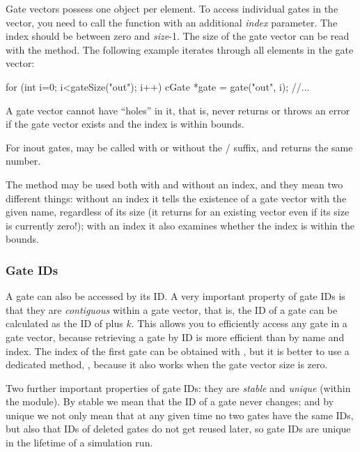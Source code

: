 Gate vectors possess one  object per element.
To access individual gates in the vector, you need to call
the  function with an additional \textit{index}
parameter. The index should be between zero and \textit{size}-1.
The size of the gate vector can be read with the 
method. The following example iterates through all elements in the
gate vector:

\begin{cpp}
for (int i=0; i<gateSize("out"); i++) {
    cGate *gate = gate("out", i);
    //...
}
\end{cpp}

A gate vector cannot have ``holes'' in it, that is, 
never returns  or throws an error if the gate vector exists
and the index is within bounds.

For inout gates,  may be called with or without
the / suffix, and returns the same number.

The  method may be used both with and without an
index, and they mean two different things: without an index it tells
the existence of a gate vector with the given name, regardless of its
size (it returns  for an existing vector even if its size
is currently zero!); with an index it also examines whether the index
is within the bounds.


\subsubsection{Gate IDs}

A gate can also be accessed by its ID. A very important property of gate IDs
is that they are \textit{contiguous} within a gate vector, that is,
the ID of a gate  can be calculated as the ID of  plus $k$.
This allows you to efficiently access any gate in a gate vector, because
retrieving a gate by ID is more efficient than by name and index.
The index of the first gate can be obtained with ,
but it is better to use a dedicated method, ,
because it also works when the gate vector size is zero.

Two further important properties of gate IDs: they are \textit{stable}
and \textit{unique} (within the module). By stable we mean that the ID
of a gate never changes; and by unique we not only mean that at any
given time no two gates have the same IDs, but also that IDs of deleted
gates do not get reused later, so gate IDs are unique in the lifetime
of a simulation run.

